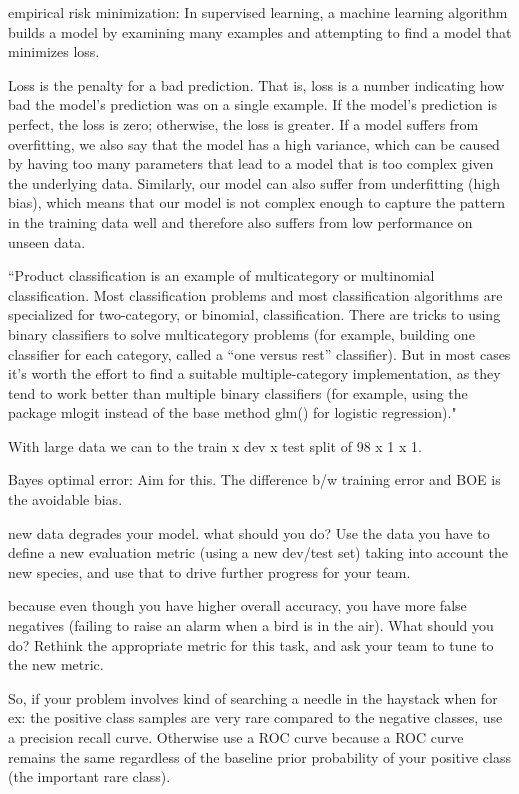 \documentclass[]{book}
\begin{document}
empirical risk minimization: In supervised learning, a machine learning algorithm builds a model by examining many examples and attempting to find a model that minimizes loss.

Loss is the penalty for a bad prediction. That is, loss is a number indicating how bad the model's prediction was on a single example. If the model's prediction is perfect, the loss is zero; otherwise, the loss is greater.
If a model suffers from overfitting, we also say that the model has a high variance, which can be caused by having too many parameters that lead to a model that is too complex given the underlying data. Similarly, our model can also suffer from underfitting (high bias), which means that our model is not complex enough to capture the pattern in the training data well and therefore also suffers from low performance on unseen data.

``Product classification is an example of multicategory or multinomial classification. Most classification problems and most classification algorithms are specialized for two-category, or binomial, classification. There are tricks to using binary classifiers to solve multicategory problems (for example, building one classifier for each category, called a ``one versus rest'' classifier). But in most cases it's worth the effort to find a suitable multiple-category implementation, as they tend to work better than multiple binary classifiers (for example, using the package mlogit instead of the base method glm() for logistic regression)."

With large data we can to the train x dev x test split of 98 x 1 x 1.

Bayes optimal error: Aim for this. The difference b/w training error and BOE is the avoidable bias.

new data degrades your model. what should you do? Use the data you have to define a new evaluation metric (using a new dev/test set) taking into account the new species, and use that to drive further progress for your team.

because even though you have higher overall accuracy, you have more false negatives (failing to raise an alarm when a bird is in the air). What should you do? Rethink the appropriate metric for this task, and ask your team to tune to the new metric.

So, if your problem involves kind of searching a needle in the haystack when for ex: the positive class samples are very rare compared to the negative classes, use a precision recall curve. Otherwise use a ROC curve because a ROC curve remains the same regardless of the baseline prior probability of your positive class (the important rare class).
\end{document}

